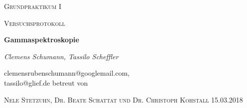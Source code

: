\documentclass[11pt,a4paper]{article}
\begin{document}
 \begin{center}
  {\scshape\LARGE Grundpraktikum I \par}
  \vspace{1cm}
  {\scshape\Large Versuchsprotokoll\par}
  \vspace{1.5cm}
  {\huge\bfseries Gammaspektroskopie\par}
  \vspace{2cm}
  {\large \itshape{Clemens Schumann, Tassilo Scheffler}\/ \par}
  \vspace{0.5cm}
  {clemensrubenschumann@googlemail.com, \\ tassilo@glief.de}
  \vfill
  betreut von\par
  \textsc{Nele Stetzuhn, Dr. Beate Schattat und Dr. Christoph Kohstall}
  \vfill
  {\Large 15.03.2018}

  \end{center}

  \thispagestyle{empty}
 \newpage
 \setcounter{page}{1}
 \tableofcontents
 \newpage
 
\end{document}
